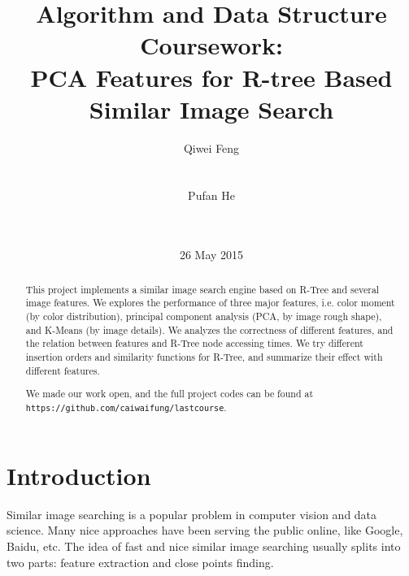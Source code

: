 \documentclass{acm_proc_article-sp}
\begin{document}
\title{Algorithm and Data Structure Coursework: \\PCA Features for
R-tree Based Similar Image Search}
\subtitle{}
%
%
\author{
%
%
\alignauthor
Qiwei Feng\\
       \\
       \\
\alignauthor
Pufan He\\
       \\
       \\
}
\date{26 May 2015}

\maketitle
\begin{abstract}
This project implements a similar image search engine based on R-Tree and
several image features. We explores the performance of three major features,
i.e. color moment (by color distribution), principal component analysis (PCA,
by image rough shape), and K-Means (by image details). We analyzes the
correctness of different features, and the relation between features and R-Tree
node accessing times. We try different insertion orders and similarity
functions for R-Tree, and summarize their effect with different features.

We made our work open, and the full project codes can be found at \texttt{https://github.com/caiwaifung/lastcourse}.
\end{abstract}


\section{Introduction}
Similar image searching is a popular problem in computer vision and data
science. Many nice approaches have been serving the public online, like Google,
Baidu, etc. The idea of fast and nice similar image searching usually splits
into two parts: feature extraction and close points finding.
\end{document}
